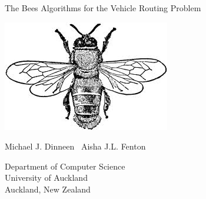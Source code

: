 

\begin{titlepage}


\LARGE
\begin{flushleft}
The Bees Algorithms for the Vehicle Routing Problem
\end{flushleft}

\includegraphics[scale=0.25]{images/bee.jpeg}

\normalsize
\begin{flushleft}
Michael J. Dinneen \ Aisha J.L. Fenton
\end{flushleft}

\vfill
\rmfamily
\begin{flushright}
Department of Computer Science\\
University of Auckland \\
Auckland, New Zealand 
\end{flushright}

\end{titlepage}
